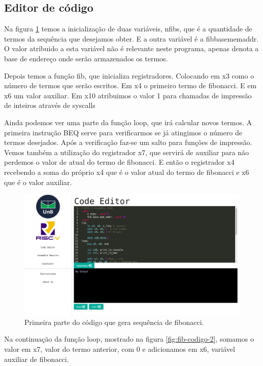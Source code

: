 \subsection{Editor de código}


	Na figura \ref{fig:fib-codigo-1} temos a inicialização de duas variáveis, n\textunderscore fibs, que é a quantidade de termos da sequência que desejamos obter. E a outra variável é a fib\textunderscore base\textunderscore mem\textunderscore addr. O valor atribuido a esta variável não é relevante neste programa, apenas denota a base de endereço onde serão armazenados os termos.

	Depois temos a função fib, que inicializa registradores. Colocando em x3 como o número de termos que serão escritos. Em x4 o primeiro termo de fibonacci. E em x6 um valor auxiliar. Em x10 atribuimos o valor 1 para chamadas de impressão de inteiros através de syscalls 

	Ainda podemos ver uma parte da função loop, que irá calcular novos termos. A primeira instrução BEQ serve para verificarmos se já atingimos o número de termos desejados. Após a verificação faz-se um salto para funções de impressão. Vemos também a utilização do registrador x7, que servirá de auxiliar para não perdemos o valor de atual do termo de fibonacci. E então o registrador x4 recebendo a soma do próprio x4 que é o valor atual do termo de fibonacci e x6 que é o valor auxiliar.

	\begin{figure}[h!]
	  \centering
	  \includegraphics[width=14cm]{img/fibonacci_codigo_1.png}
	  \caption{Primeira parte do código que gera sequência de fibonacci.}
	  \label{fig:fib-codigo-1}
	\end{figure}

	Na continuação da função loop, mostrado na figura \ref{fig:fib-codigo-2}, somamos o valor em x7, valor do termo anterior, com 0 e adicionamos em x6, variável auxiliar de fibonacci.

